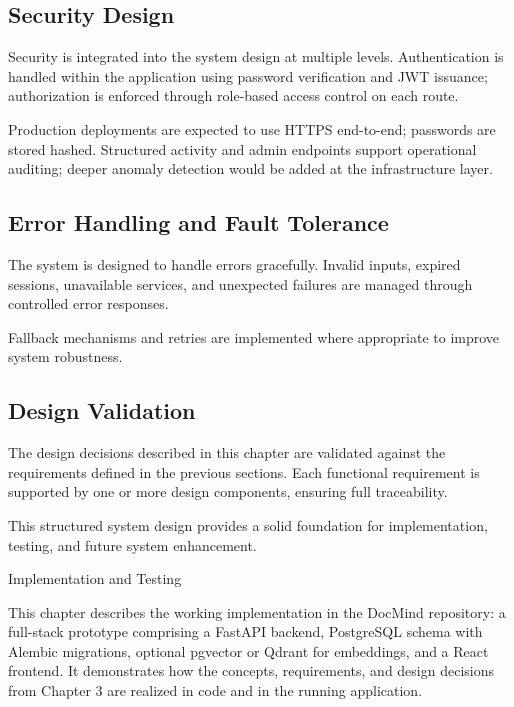 \documentclass[12pt, a4paper, oneside]{report}
\makeatletter
\newcommand{\chapformat}[1]{%
  \centering
  {\fontsize{14}{17}\selectfont\itshape\addfontfeatures{LetterSpace=3.5}%
    \MakeUppercase{\chaptertitlename}\ \thechapter}\\[24pt]%
  {\fontsize{16}{19}\selectfont\bfseries\addfontfeatures{LetterSpace=0}%
    \MakeUppercase{#1}}%
}
\newcommand{\chapformatstar}[1]{%
  \centering
  {\fontsize{16}{19}\selectfont\bfseries\MakeUppercase{#1}}%
}
\newcommand{\chapterstar}[1]{%
  \clearpage
  \phantomsection
  \edef\@saved@chapcount{\the\value{chapter}}%
  \titleformat{\chapter}[block]{}{}%
    {0pt}{\chapformatstar}%
  \@originalchapter*{#1}%
  \setcounter{chapter}{\@saved@chapcount}%
  \titleformat{\chapter}[block]{}{}%
    {0pt}{\chapformat}%
}
\let\@originalchapter\chapter
\renewcommand{\chapter}{%
  \@ifstar{\chapterstar}{\@originalchapter}%
}
\let\oldsubsection\subsection
\renewcommand{\subsection}{%
  \addtocontents{toc}{\protect\needspace{3\baselineskip}}%
  \oldsubsection
}
\makeatother
\begin{document}
\newpage

\subsection{Security Design}

Security is integrated into the system design at multiple levels. Authentication is handled within the application using password verification and JWT issuance; authorization is enforced through role-based access control on each route.

Production deployments are expected to use HTTPS end-to-end; passwords are stored hashed. Structured activity and admin endpoints support operational auditing; deeper anomaly detection would be added at the infrastructure layer.

\subsection{Error Handling and Fault Tolerance}

The system is designed to handle errors gracefully. Invalid inputs, expired sessions, unavailable services, and unexpected failures are managed through controlled error responses.

Fallback mechanisms and retries are implemented where appropriate to improve system robustness.

\subsection{Design Validation}

The design decisions described in this chapter are validated against the requirements defined in the previous sections. Each functional requirement is supported by one or more design components, ensuring full traceability.

This structured system design provides a solid foundation for implementation, testing, and future system enhancement.

\chapter{Implementation and Testing}

This chapter describes the working implementation in the DocMind repository: a full-stack prototype comprising a FastAPI backend, PostgreSQL schema with Alembic migrations, optional pgvector or Qdrant for embeddings, and a React frontend. It demonstrates how the concepts, requirements, and design decisions from Chapter 3 are realized in code and in the running application.
\end{document}
